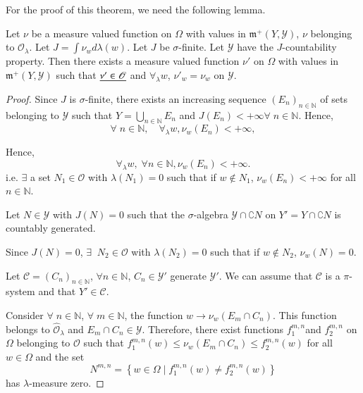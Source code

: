 For the proof of this theorem, we need the following lemma.

\begin{lem}\label{part1:chap3:lem47}
Let $\nu$ be a measure valued function on $\Omega$ with values in
$\mathfrak{m}^+ (Y, \mathscr{Y})$, $\nu$ belonging to
$\hat{\mathscr{O}}_\lambda$. Let $J = \int \nu_w d \lambda(w)$. Let
$J$ be $\sigma$-finite. Let $\mathscr{Y}$ have the $J$-countability
property. Then there exists a measure valued function $\nu'$ on
$\Omega$ with values in $\mathfrak{m}^+ (Y, \mathscr{Y})$ such that
$\underline{\nu'\in \mathscr{O}}$ and $\forall_\lambda w$, $\nu'_w = \nu_w$ on
$\mathscr{Y}$. 
\end{lem}

\begin{proof}
Since $J$ is $\sigma$-finite, there exists an increasing sequence
$(E_n)_{n \in \mathbb{N}}$ of sets belonging to $\mathscr{Y}$ such
that $Y = \bigcup\limits_{n \in \mathbb{N}} E_n$ and $J(E_n) < +
\infty \forall \; n \in \mathbb{N}$. Hence, 
$$
\forall \; n \in \mathbb{N}, \quad \forall_\lambda w, \nu_w (E_n) < +
\infty, 
$$

Hence,
$$
\forall_\lambda w, \; \forall n \in \mathbb{N}, \nu_w (E_n) < +
\infty. 
$$
i.e. $\exists$ a set $N_1 \in \mathscr{O}$ with $\lambda(N_1) = 0$
such that if $w \not\in N_1$, $\nu_w(E_n) < + \infty$ for all $n \in
\mathbb{N}$. 

Let $N \in \mathscr{Y}$ with $J(N) = 0$ such that the $\sigma$-algebra
$\mathscr{Y} \cap \complement N$ on $Y' = Y \cap \complement N$ is
countably generated. 

Since $J(N) = 0$, $\exists \;\; N_2 \in \mathscr{O}$ with $\lambda(N_2)=0$
such that if $w \not\in N_2$, $\nu_w(N) =0$. 

Let $\mathscr{C} = (C_n)_{n \in \mathbb{N}}$, $\forall n \in
\mathbb{N}$, $C_n \in \mathscr{Y}'$ generate $\mathscr{Y}'$. We can
assume that $\mathscr{C}$ is a $\pi$-system and that $Y' \in
\mathscr{C}$. 

Consider $\forall\; n \in \mathbb{N}$, $\forall\; m \in \mathbb{N}$,
the function $w \to \nu_w (E_m \cap C_n)$. This function belongs to
$\hat{\mathscr{O}}_\lambda$ and $E_m \cap C_n \in
\mathscr{Y}$. Therefore, there exist functions
$f^{m,n}_1$\pageoriginale and $f^{m,n}_2$ on $\Omega$ belonging to
$\mathscr{O}$ such that $f^{m,n}_1(w) \leq \nu_w(E_m \cap C_n) \leq
f^{m,n}_2(w)$ for all $w \in \Omega$ and the set 
$$N^{m,n} = \left\{ w
\in\Omega \mid f^{m,n}_1 (w) \neq f^{m,n}_2(w)\right\}$$ 
has $\lambda$-measure zero. 


\end{proof}

